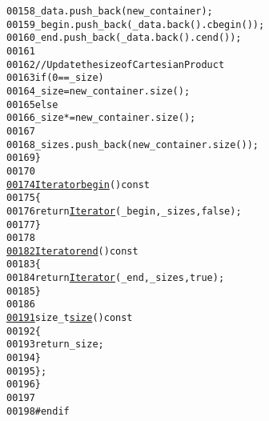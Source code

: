 \begin{footnotesize}
\begin{alltt}
00158                 \_data.push\_back(new\_container);
00159                 \_begin.push\_back(\_data.back().cbegin());
00160                 \_end.push\_back(\_data.back().cend());
00161 
00162                 \textcolor{comment}{// Update the size of CartesianProduct}
00163                 \textcolor{keywordflow}{if} (0 == \_size)
00164                     \_size = new\_container.size();
00165                 \textcolor{keywordflow}{else}
00166                     \_size *= new\_container.size();
00167 
00168                 \_sizes.push\_back(new\_container.size());
00169             \}
00170 
\hypertarget{cartesian-product_8hh_source_l00174}{}\hyperlink{classeos_1_1CartesianProduct_a34cc259ef3e5c9e0773e816449787abd}{00174}             \hyperlink{classeos_1_1CartesianProduct_aa2ff28e4a1845a8ee763a877a8cd4346}{Iterator} \hyperlink{classeos_1_1CartesianProduct_a34cc259ef3e5c9e0773e816449787abd}{begin}()\textcolor{keyword}{ const}
00175 \textcolor{keyword}{            }\{
00176                 \textcolor{keywordflow}{return} \hyperlink{classeos_1_1CartesianProduct_aa2ff28e4a1845a8ee763a877a8cd4346}{Iterator}(\_begin, \_sizes, \textcolor{keyword}{false});
00177             \}
00178 
\hypertarget{cartesian-product_8hh_source_l00182}{}\hyperlink{classeos_1_1CartesianProduct_a7c37fe657fc7d312ae482ab581d3392f}{00182}             \hyperlink{classeos_1_1CartesianProduct_aa2ff28e4a1845a8ee763a877a8cd4346}{Iterator} \hyperlink{classeos_1_1CartesianProduct_a7c37fe657fc7d312ae482ab581d3392f}{end}()\textcolor{keyword}{ const}
00183 \textcolor{keyword}{            }\{
00184                 \textcolor{keywordflow}{return} \hyperlink{classeos_1_1CartesianProduct_aa2ff28e4a1845a8ee763a877a8cd4346}{Iterator}(\_end, \_sizes, \textcolor{keyword}{true});
00185             \}
00186 
\hypertarget{cartesian-product_8hh_source_l00191}{}\hyperlink{classeos_1_1CartesianProduct_a5825cf1120b0464a9ce21c65239f0c9b}{00191}             \textcolor{keywordtype}{size\_t} \hyperlink{classeos_1_1CartesianProduct_a5825cf1120b0464a9ce21c65239f0c9b}{size}()\textcolor{keyword}{ const}
00192 \textcolor{keyword}{            }\{
00193                 \textcolor{keywordflow}{return} \_size;
00194             \}
00195     \};
00196 \}
00197 
00198 \textcolor{preprocessor}{#endif}
\end{alltt}\end{footnotesize}
